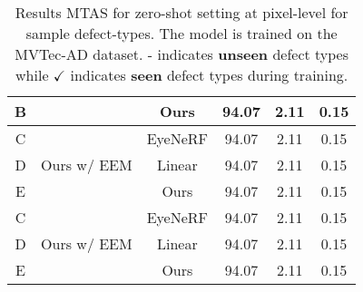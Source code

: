 \documentclass[letterpaper]{article} %
\begin{document}
\begin{table*}[htbp]
{\begin{minipage}{0.52\textwidth}
\begin{tabular}{c|c|c|ccc}
            B&&Ours   &\cellcolor{color1}94.07   & \cellcolor{color2}2.11   & \cellcolor{color3}0.15   \\
\midrule
            C&\multirow{3}{*}{Ours w/ EEM}&EyeNeRF   & 94.07   & 2.11   & 0.15   \\
            D&&Linear   & 94.07   & 2.11   & 0.15   \\
            E&&Ours   &\cellcolor{color1}94.07   & \cellcolor{color2}2.11   & \cellcolor{color3}0.15\\
\midrule
            C&\multirow{3}{*}{Ours w/ EEM}&EyeNeRF   & 94.07   & 2.11   & 0.15   \\
            D&&Linear   &\cellcolor{color1}94.07   & \cellcolor{color2}2.11   & \cellcolor{color3}0.15\\
            E&&Ours   & 94.07   & 2.11   & 0.15   \\
            \bottomrule
        \end{tabular}
    \end{minipage}
    }
    \caption{Results MTAS for zero-shot setting at pixel-level for sample defect-types. The model is trained on the MVTec-AD dataset. - indicates \textbf{unseen} defect types while $\checkmark$ indicates \textbf{seen} defect types during training.}
\end{table*}
\end{document}
